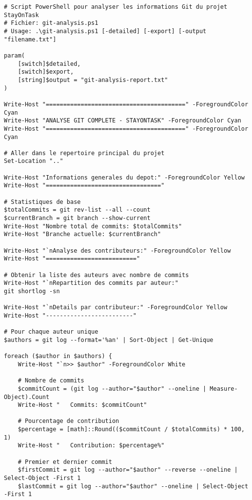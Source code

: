 \documentclass[12pt,a4paper]{article}
\begin{document}
\begin{lstlisting}[caption=Script d'extraction Git complet - git-analysis.ps1]
# Script PowerShell pour analyser les informations Git du projet StayOnTask
# Fichier: git-analysis.ps1
# Usage: .\git-analysis.ps1 [-detailed] [-export] [-output "filename.txt"]

param(
    [switch]$detailed,
    [switch]$export,
    [string]$output = "git-analysis-report.txt"
)

Write-Host "========================================" -ForegroundColor Cyan
Write-Host "ANALYSE GIT COMPLETE - STAYONTASK" -ForegroundColor Cyan  
Write-Host "========================================" -ForegroundColor Cyan

# Aller dans le repertoire principal du projet
Set-Location ".."

Write-Host "Informations generales du depot:" -ForegroundColor Yellow
Write-Host "================================="

# Statistiques de base
$totalCommits = git rev-list --all --count
$currentBranch = git branch --show-current
Write-Host "Nombre total de commits: $totalCommits"
Write-Host "Branche actuelle: $currentBranch"

Write-Host "`nAnalyse des contributeurs:" -ForegroundColor Yellow
Write-Host "=========================="

# Obtenir la liste des auteurs avec nombre de commits
Write-Host "`nRepartition des commits par auteur:"
git shortlog -sn

Write-Host "`nDetails par contributeur:" -ForegroundColor Yellow
Write-Host "-------------------------"

# Pour chaque auteur unique
$authors = git log --format='%an' | Sort-Object | Get-Unique

foreach ($author in $authors) {
    Write-Host "`n>> $author" -ForegroundColor White
    
    # Nombre de commits
    $commitCount = (git log --author="$author" --oneline | Measure-Object).Count
    Write-Host "   Commits: $commitCount"
    
    # Pourcentage de contribution
    $percentage = [math]::Round(($commitCount / $totalCommits) * 100, 1)
    Write-Host "   Contribution: $percentage%"
    
    # Premier et dernier commit
    $firstCommit = git log --author="$author" --reverse --oneline | Select-Object -First 1
    $lastCommit = git log --author="$author" --oneline | Select-Object -First 1
    

\end{lstlisting}
\end{document}

